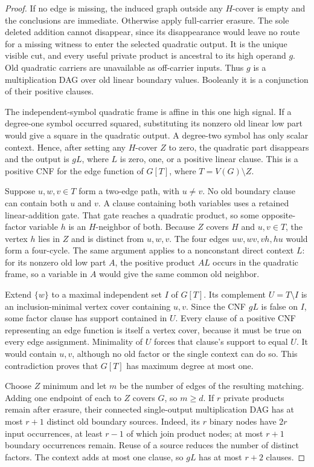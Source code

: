 \begin{proof}
If no edge is missing, the induced graph outside any $H$-cover is empty and the conclusions are immediate. Otherwise apply full-carrier erasure. The sole deleted addition cannot disappear, since its disappearance would leave no route for a missing witness to enter the selected quadratic output. It is the unique visible cut, and every useful private product is ancestral to its high operand $g$. Old quadratic carriers are unavailable as off-carrier inputs. Thus $g$ is a multiplication DAG over old linear boundary values. Booleanly it is a conjunction of their positive clauses.

The independent-symbol quadratic frame is affine in this one high signal. If a degree-one symbol occurred squared, substituting its nonzero old linear low part would give a square in the quadratic output. A degree-two symbol has only scalar context. Hence, after setting any $H$-cover $Z$ to zero, the quadratic part disappears and the output is $gL$, where $L$ is zero, one, or a positive linear clause. This is a positive CNF for the edge function of $G[T]$, where $T=V(G)\setminus Z$.

Suppose $u,w,v\in T$ form a two-edge path, with $u\ne v$. No old boundary clause can contain both $u$ and $v$. A clause containing both variables uses a retained linear-addition gate. That gate reaches a quadratic product, so some opposite-factor variable $h$ is an $H$-neighbor of both. Because $Z$ covers $H$ and $u,v\in T$, the vertex $h$ lies in $Z$ and is distinct from $u,w,v$. The four edges $uw,wv,vh,hu$ would form a four-cycle. The same argument applies to a nonconstant direct context $L$: for its nonzero old low part $A$, the positive product $AL$ occurs in the quadratic frame, so a variable in $A$ would give the same common old neighbor.

Extend $\{w\}$ to a maximal independent set $I$ of $G[T]$. Its complement $U=T\setminus I$ is an inclusion-minimal vertex cover containing $u,v$. Since the CNF $gL$ is false on $I$, some factor clause has support contained in $U$. Every clause of a positive CNF representing an edge function is itself a vertex cover, because it must be true on every edge assignment. Minimality of $U$ forces that clause's support to equal $U$. It would contain $u,v$, although no old factor or the single context can do so. This contradiction proves that $G[T]$ has maximum degree at most one.

Choose $Z$ minimum and let $m$ be the number of edges of the resulting matching. Adding one endpoint of each to $Z$ covers $G$, so $m\ge d$. If $r$ private products remain after erasure, their connected single-output multiplication DAG has at most $r+1$ distinct old boundary sources. Indeed, its $r$ binary nodes have $2r$ input occurrences, at least $r-1$ of which join product nodes; at most $r+1$ boundary occurrences remain. Reuse of a source reduces the number of distinct factors. The context adds at most one clause, so $gL$ has at most $r+2$ clauses.


\end{proof}
